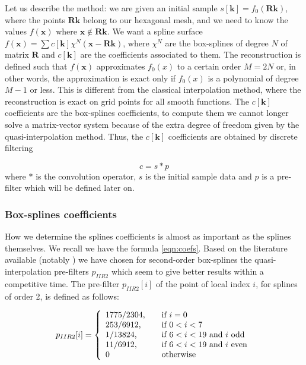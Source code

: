\documentclass[proc]{edpsmath}
\begin{document}
Let us describe the method: we are given an initial sample $s[\mathbf{k}] = f_0(\mathbf{R} \mathbf{k})$, where the points $\mathbf{R} \mathbf{k}$ belong to our hexagonal mesh, and we need to know the values $f(\mathbf{x})$ where $\mathbf{x} \notin \mathbf{R} \mathbf{k}$. We want a spline surface $f(\mathbf{x}) = \sum c[\mathbf{k}] \chi^N(\mathbf{x} - \mathbf{R}\mathbf{k})$, where $\chi^N$ are the box-splines of degree $N$ of matrix $\mathbf{R}$ and $c[\mathbf{k}]$ are the coefficients associated to them. The reconstruction is defined such that $f(\mathbf{x})$ approximates $f_0(x)$ to a certain order $M=2N$ or, in other words, the approximation is exact only if $f_0(x)$ is a polynomial of degree $M-1$ or less. This is different from the classical interpolation method, where the reconstruction is exact on grid points for all smooth functions. The $c[\mathbf{k}]$ coefficients are the box-splines coefficients, to compute them we cannot longer solve a matrix-vector system because of the extra degree of freedom given by the quasi-interpolation method. Thus, the  $c[\mathbf{k}]$ coefficients are obtained by discrete filtering\cite{Condat2006a}

\begin{equation}
\label{eqn:coefs}
 c = s * p
\end{equation}
where $*$ is the convolution operator, $s$ is the initial sample data and $p$ is a pre-filter which will be defined later on.


\subsubsection{Box-splines coefficients}

How we determine the splines coefficients is almost as important as the splines themselves. We recall we have the formula \eqref{eqn:coefs}. Based on the literature available (notably \cite{Condat2007}) we have chosen for second-order box-splines the quasi-interpolation pre-filters $p_{IIR2}$ which seem to give better results within a competitive time. The pre-filter $p_{IIR2}[i]$ of the point of local index $i$, for splines of order 2, is defined as follows: 


\begin{equation}
\label{eqn:filterIIR2}
p_{IIR2} [i] = \left\{
  \begin{array}{l l}
    1775/2304\text{,} & \quad \text{if } i = 0\\
    253/6912\text{,} & \quad \text{if } 0<i<7\\
    1/13824\text{,} & \quad \text{if } 6<i<19 \text{ and $i$ odd}\\
    11/6912\text{,} & \quad \text{if } 6<i<19 \text{ and $i$ even}\\
    0 & \quad \text{otherwise}
  \end{array} \right.
\end{equation}
\end{document}
